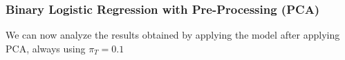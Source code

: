 \documentclass{article}
\begin{document}
\subsubsection*{Binary Logistic Regression with Pre-Processing (PCA)}
We can now analyze the results obtained by applying the model after applying PCA, always using \(\pi_T=0.1\)
\end{document}

